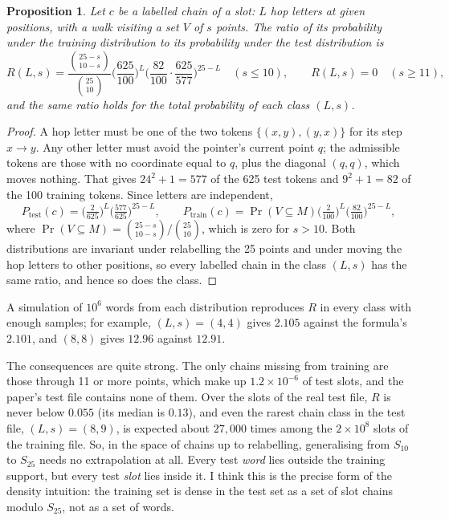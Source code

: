 \documentclass[11pt,a4paper]{article}
\newtheorem{proposition}{Proposition}
\begin{document}
\begin{proposition}\label{prop:coverage}
Let $c$ be a labelled chain of a slot: $L$ hop letters at given positions, with a walk visiting a set $V$ of $s$ points. The ratio of its probability under the training distribution to its probability under the test distribution is
\[
R(L,s)=\frac{\binom{25-s}{10-s}}{\binom{25}{10}}\Big(\frac{625}{100}\Big)^{L}\Big(\frac{82}{100}\cdot\frac{625}{577}\Big)^{25-L}\quad (s\le 10),\qquad R(L,s)=0\quad (s\ge 11),
\]
and the same ratio holds for the total probability of each class $(L,s)$.
\end{proposition}
\begin{proof}
A hop letter must be one of the two tokens $\{(x,y),(y,x)\}$ for its step $x\to y$. Any other letter must avoid the pointer's current point $q$; the admissible tokens are those with no coordinate equal to $q$, plus the diagonal $(q,q)$, which moves nothing. That gives $24^2+1=577$ of the 625 test tokens and $9^2+1=82$ of the 100 training tokens. Since letters are independent,
\[
P_{\mathrm{test}}(c)=\Big(\tfrac{2}{625}\Big)^{L}\Big(\tfrac{577}{625}\Big)^{25-L},\qquad P_{\mathrm{train}}(c)=\Pr(V\subseteq M)\Big(\tfrac{2}{100}\Big)^{L}\Big(\tfrac{82}{100}\Big)^{25-L},
\]
where $\Pr(V\subseteq M)=\binom{25-s}{10-s}/\binom{25}{10}$, which is zero for $s>10$. Both distributions are invariant under relabelling the 25 points and under moving the hop letters to other positions, so every labelled chain in the class $(L,s)$ has the same ratio, and hence so does the class.
\end{proof}

A simulation of $10^6$ words from each distribution reproduces $R$ in every class with enough samples; for example, $(L,s)=(4,4)$ gives $2.105$ against the formula's $2.101$, and $(8,8)$ gives $12.96$ against $12.91$.

The consequences are quite strong. The only chains missing from training are those through 11 or more points, which make up $1.2\times10^{-6}$ of test slots, and the paper's test file contains none of them. Over the slots of the real test file, $R$ is never below $0.055$ (its median is $0.13$), and even the rarest chain class in the test file, $(L,s)=(8,9)$, is expected about $27{,}000$ times among the $2\times10^8$ slots of the training file. So, in the space of chains up to relabelling, generalising from $S_{10}$ to $S_{25}$ needs no extrapolation at all. Every test \emph{word} lies outside the training support, but every test \emph{slot} lies inside it. I think this is the precise form of the density intuition: the training set is dense in the test set as a set of slot chains modulo $S_{25}$, not as a set of words.
\end{document}
